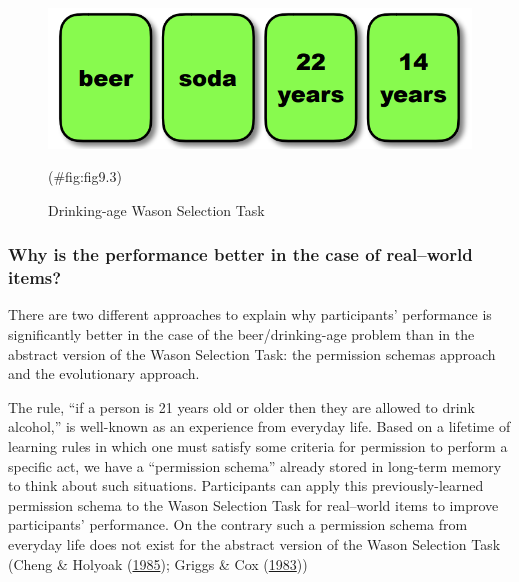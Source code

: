 \documentclass[
]{krantz}
\begin{document}
\begin{figure}

{\centering \includegraphics[width=0.6\linewidth]{images/ch9/fig3} 

}

\caption{Drinking-age Wason Selection Task}(\#fig:fig9.3)
\end{figure}

\hypertarget{why-is-the-performance-better-in-the-case-of-realworld-items}{%
\subsubsection*{Why is the performance better in the case of real--world items?}\label{why-is-the-performance-better-in-the-case-of-realworld-items}}


There are two different approaches to explain why participants' performance is significantly better in the case of the beer/drinking-age problem than in the abstract version of the Wason Selection Task: the permission schemas approach and the evolutionary approach.

The rule, ``if a person is 21 years old or older then they are allowed to drink alcohol,'' is well-known as an experience from everyday life. Based on a lifetime of learning rules in which one must satisfy some criteria for permission to perform a specific act, we have a ``permission schema'' already stored in long-term memory to think about such situations. Participants can apply this previously-learned permission schema to the Wason Selection Task for real--world items to improve participants' performance. On the contrary such a permission schema from everyday life does not exist for the abstract version of the Wason Selection Task (Cheng \& Holyoak (\protect\hyperlink{ref-cheng1985pragmatic}{1985}); Griggs \& Cox (\protect\hyperlink{ref-griggs1983effects}{1983}))
\end{document}
